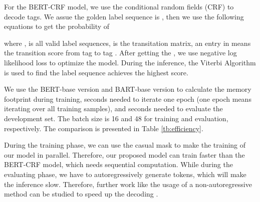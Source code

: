 \documentclass[11pt,a4paper]{article}
\begin{document}
For the BERT-CRF model, we use the conditional random fields (CRF) \cite{lafferty2001conditional} to decode tags. We assue the golden label sequence is , then we use the following equations to get the probability of 

where ,  is all valid label sequences,  is the transitation matrix, an entry  in   means the transition score from tag  to tag . After getting the , we use negative log likelihood loss to optimize the model. During the inference, the Viterbi Algorithm is used to find the label sequence achieves the highest score. 

We use the BERT-base version and BART-base version to calculate the memory footprint during training, seconds needed to iterate one epoch (one epoch means iterating over all training samples), and seconds needed to evaluate the development set. The batch size is 16 and 48 for training and evaluation, respectively. The comparison is presented in Table \ref{tb:efficiency}. 

During the training phase, we can use the casual mask to make the training of our model in parallel. Therefore, our proposed model can train faster than the BERT-CRF model, which needs sequential computation. While during the evaluating phase, we have to autoregressively generate tokens, which will make the inference slow. Therefore, further work like the usage of a non-autoregressive method can be studied to speed up the decoding \cite{DBLP:conf/iclr/Gu0XLS18}.
\end{document}
